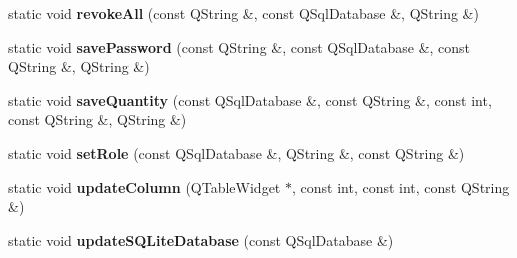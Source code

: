 \begin{DoxyCompactItemize}
\item 
static void {\bfseries revoke\+All} (const Q\+String \&, const Q\+Sql\+Database \&, Q\+String \&)\hypertarget{classbiblioteq__misc__functions_a97177d3ce751b33c9779f232ade007d8}{}\label{classbiblioteq__misc__functions_a97177d3ce751b33c9779f232ade007d8}

\item 
static void {\bfseries save\+Password} (const Q\+String \&, const Q\+Sql\+Database \&, const Q\+String \&, Q\+String \&)\hypertarget{classbiblioteq__misc__functions_a1f4f5c049e07f1ab4156802acb58d68e}{}\label{classbiblioteq__misc__functions_a1f4f5c049e07f1ab4156802acb58d68e}

\item 
static void {\bfseries save\+Quantity} (const Q\+Sql\+Database \&, const Q\+String \&, const int, const Q\+String \&, Q\+String \&)\hypertarget{classbiblioteq__misc__functions_a56a6aecf1d2282cd45a1d86529097f0f}{}\label{classbiblioteq__misc__functions_a56a6aecf1d2282cd45a1d86529097f0f}

\item 
static void {\bfseries set\+Role} (const Q\+Sql\+Database \&, Q\+String \&, const Q\+String \&)\hypertarget{classbiblioteq__misc__functions_a0e9e45e40ffacf10a1d8e68aeeda35ea}{}\label{classbiblioteq__misc__functions_a0e9e45e40ffacf10a1d8e68aeeda35ea}

\item 
static void {\bfseries update\+Column} (Q\+Table\+Widget $\ast$, const int, const int, const Q\+String \&)\hypertarget{classbiblioteq__misc__functions_abb215c1f974c1ea949260a27ff3d2118}{}\label{classbiblioteq__misc__functions_abb215c1f974c1ea949260a27ff3d2118}

\item 
static void {\bfseries update\+S\+Q\+Lite\+Database} (const Q\+Sql\+Database \&)\hypertarget{classbiblioteq__misc__functions_ac146440bab67ce1886f7f7163190fadf}{}\label{classbiblioteq__misc__functions_ac146440bab67ce1886f7f7163190fadf}

\end{DoxyCompactItemize}
